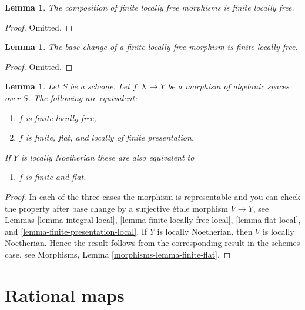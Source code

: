 \documentclass{stacks-project}
\theoremstyle{plain}
\newtheorem{lemma}[subsection]{Lemma}
\theoremstyle{definition}
\theoremstyle{remark}
\numberwithin{equation}{subsection}
\begin{document}
\begin{lemma}
\label{lemma-composition-finite-locally-free}
The composition of finite locally free morphisms is finite locally free.
\end{lemma}

\begin{proof}
Omitted.
\end{proof}

\begin{lemma}
\label{lemma-base-change-finite-locally-free}
The base change of a finite locally free morphism is finite locally free.
\end{lemma}

\begin{proof}
Omitted.
\end{proof}

\begin{lemma}
\label{lemma-finite-flat}
Let $S$ be a scheme.
Let $f : X \to Y$ be a morphism of algebraic spaces over $S$.
The following are equivalent:
\begin{enumerate}
\item $f$ is finite locally free,
\item $f$ is finite, flat, and locally of finite presentation.
\end{enumerate}
If $Y$ is locally Noetherian these are also equivalent to
\begin{enumerate}
\item[(3)] $f$ is finite and flat.
\end{enumerate}
\end{lemma}

\begin{proof}
In each of the three cases the morphism is representable and you
can check the property after base change by a surjective \'etale morphism
$V \to Y$, see
Lemmas \ref{lemma-integral-local},
\ref{lemma-finite-locally-free-local},
\ref{lemma-flat-local}, and
\ref{lemma-finite-presentation-local}.
If $Y$ is locally Noetherian, then $V$ is locally Noetherian.
Hence the result follows from the corresponding result
in the schemes case, see
Morphisms, Lemma \ref{morphisms-lemma-finite-flat}.
\end{proof}





\section{Rational maps}
\label{section-rational-maps}
\end{document}
